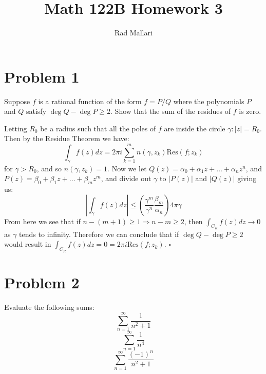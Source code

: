\documentclass[11pt]{article}
\title{Math 122B Homework 3}
\author{Rad Mallari}
\newenvironment{proof}{\noindent{\bf Proof.}}{\hfill $\square$\medskip}
\begin{document}
\maketitle

\section{Problem 1}
Suppose $f$ is a rational function of the form $f=P/Q$ where the polynomials $P$ and $Q$ satisfy
$\deg Q-\deg P\geq 2$. Show that the sum of the residues of $f$ is zero.

\begin{proof}
Letting $R_{0}$ be a radius such that all the poles of $f$ are inside the circle $\gamma:|z|=R_{0}$.
Then by the Residue Theorem we have:
$$\int_{\gamma}f(z)dz=2\pi i\sum_{k=1}^{m}n(\gamma,z_{k})\text{Res}(f;z_{k})$$
for $\gamma>R_{0}$, and so $n(\gamma,z_{k})=1$. Now we let $Q(z)=\alpha_{0}+\alpha_{1}z+\dots+\alpha_{n}z^{n}$,
and $P(z)=\beta_{0}+\beta_{1}z+\dots+\beta_{m}z^{m}$, and divide out $\gamma$ to $|P(z)|$ and $|Q(z)|$ giving us:
$$\left|\int_{\gamma}f(z)dz\right|\leq\left(\frac{\gamma^{m}}{\gamma^{n}}\frac{\beta_{m}}{\alpha_{n}}\right)4\pi \gamma$$
From here we see that if $n-(m+1)\geq 1\Rightarrow n-m\geq 2$, then $\int_{C_{R}}f(z)dz\rightarrow 0$
as $\gamma$ tends to infinity. Therefore we can conclude that if $\deg Q-\deg P\geq 2$ would result in
$\int_{C_{R}}f(z)dz=0=2\pi i\text{Res}(f;z_{k})$.
\end{proof}



\section{Problem 2}
Evaluate the following sums:
$$\sum_{n=1}^{\infty}\frac{1}{n^{2}+1}$$
$$\sum_{n=1}^{\infty}\frac{1}{n^{4}}$$
$$\sum_{n=1}^{\infty}\frac{(-1)^{n}}{n^{2}+1}$$
\end{document}
